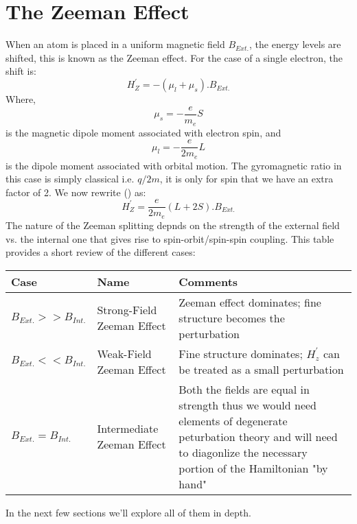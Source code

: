 \section{The Zeeman Effect}
When an atom is placed in a uniform magnetic field $B_{Ext.}$, the energy levels are shifted, this is known as the Zeeman effect. For the case of a single electron, the shift is:
\begin{equation}
H^{'}_{Z} = -(\mu_{l} + \mu_{s}).B_{Ext.}
\end{equation}
Where,
\begin{equation}
\mu_{s} = -\frac{e}{m_{e}}S
\end{equation}
is the magnetic dipole moment associated with electron spin, and
\begin{equation}
\mu_{l} = -\frac{e}{2m_{e}}L
\end{equation}
is the dipole moment associated with orbital motion. The gyromagnetic ratio in this case is simply classical i.e. $q/2m$, it is only for spin that we have an extra factor of 2. We now rewrite () as:
\begin{equation}
H^{'}_{Z} = \frac{e}{2m_{e}}(L + 2S).B_{Ext.}
\end{equation}
The nature of the Zeeman splitting depnds on the strength of the external field vs. the internal one that gives rise to spin-orbit/spin-spin coupling. This table provides a short review of the different cases:
\begin{center}
\begin{tabularx}{0.9\textwidth} { 
		| >{\centering\arraybackslash}X 
		| >{\centering\arraybackslash}X 
		| >{\centering\arraybackslash}X | }
	\hline
	\textbf{Case} & \textbf{Name} & \textbf{Comments} \\
	\hline
	$B_{Ext.} >> B_{Int.}$  & Strong-Field Zeeman Effect  & Zeeman effect dominates; fine structure becomes the perturbation  \\
	\hline
	$B_{Ext.} << B_{Int.}$  & Weak-Field Zeeman Effect  & Fine structure dominates; $H^{'}_{z}$ can be treated as a small perturbation   \\
	\hline
	$B_{Ext.} = B_{Int.}$  & Intermediate Zeeman Effect  & Both the fields are equal in strength thus we would need elements of degenerate peturbation theory and will need to diagonlize the necessary portion of the Hamiltonian "by hand" \\
	\hline
\end{tabularx}
\end{center}
In the next few sections we'll explore all of them in depth.
